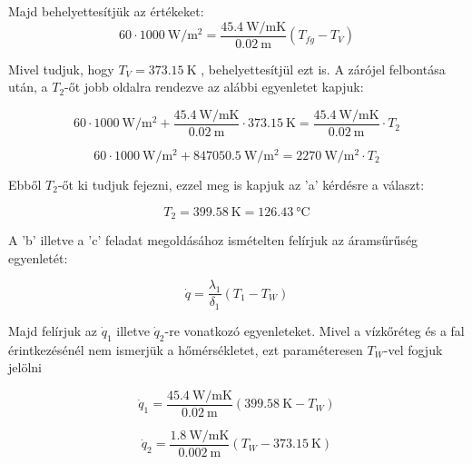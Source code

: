 Majd behelyettesítjük az értékeket:
\begin{equation}
60 \cdot \SI{1000}{\watt\per\meter^2} =  \frac{\SI{45.4}{\watt\per\meter\kelvin}}{\SI{0.02}{\meter}} (T_{fg} - T_V)
\end{equation}

Mivel tudjuk, hogy $T_V = \SI{373.15}{\kelvin}$ , behelyettesítjül ezt is.
A zárójel felbontása után, a $T_2$-őt jobb oldalra rendezve az alábbi egyenletet kapjuk:

\begin{equation}
60 \cdot \SI{1000}{\watt\per\meter^2}+  \frac{\SI{45.4}{\watt\per\meter\kelvin}}{\SI{0.02}{\meter}} \cdot \SI{373.15}{\kelvin}=  \frac{\SI{45.4}{\watt\per\meter\kelvin}}{\SI{0.02}{\meter}} \cdot T_2
\end{equation}

\begin{equation}
60 \cdot \SI{1000}{\watt\per\meter^2} + \SI{847050.5}{\watt\per\meter^2} = \SI{2270}{\watt\per\meter^2} \cdot T_2
\end{equation}
\vspace{1mm}

Ebből $T_2$-őt ki tudjuk fejezni, ezzel meg is kapjuk az 'a' kérdésre a választ:

\begin{equation}
T_2 = \SI{399.58}{\kelvin} = \SI{126.43}{\celsius}
\end{equation}

\vspace{1mm}


A 'b' illetve a 'c' feladat megoldásához ismételten felírjuk az áramsűrűség egyenletét:

\begin{equation}
	 \dot{q} = \frac{\lambda_1}{\delta_1} (T_1 - T_W)
\end{equation}

Majd felírjuk az $\dot{q}_1$ illetve $\dot{q}_2$-re vonatkozó egyenleteket. Mivel a vízkőréteg és a fal érintkezésénél nem ismerjük a hőmérsékletet, ezt paraméteresen $T_W$-vel fogjuk jelölni

\begin{equation}
	 \dot{q}_1 =  \frac{\SI{45.4}{\watt\per\meter\kelvin}}{\SI{0.02}{\meter}} (\SI{399.58}{\kelvin} - T_W)
\end{equation}


\begin{equation}
	 \dot{q}_2 =  \frac{\SI{1.8}{\watt\per\meter\kelvin}}{\SI{0.002}{\meter}} (T_W - \SI{373.15}{\kelvin})
\end{equation}

